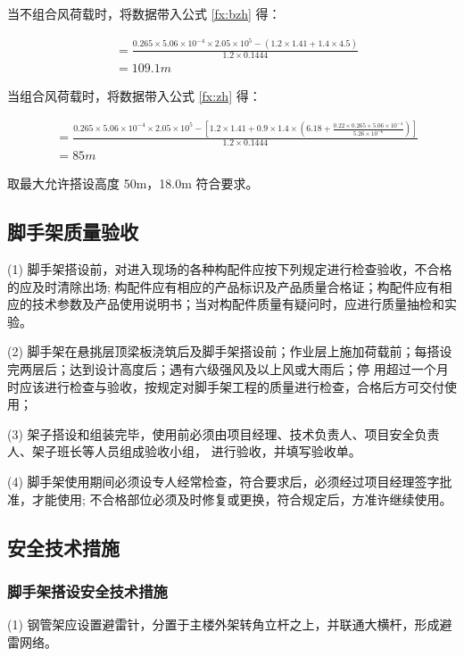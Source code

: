 当不组合风荷载时，将数据带入公式 \ref{fx:bzh} 得：

\begin{align*}
    [H] &=\frac{0.265\times 5.06\times10^{-4}\times 2.05\times 10^5-(1.2\times 1.41+1.4\times 4.5)}{1.2\times 0.1444}\\
    &=109.1m
\end{align*}

当组合风荷载时，将数据带入公式 \ref{fx:zh} 得：

\begin{align*}
[H] &=\frac{0.265\times 5.06\times10^{-4}\times 2.05\times10^5-[1.2\times 1.41+0.9\times 1.4\times(6.18+\frac{0.22\times 0.265\times 5.06\times 10^{-4}}{5.26\times 10^{-6}})]}{1.2\times 0.1444}\\
&=85m
\end{align*}

取最大允许搭设高度 50m，18.0m 符合要求。

\subsection{脚手架质量验收}

(1) 脚手架搭设前，对进入现场的各种构配件应按下列规定进行检查验收，不合格的应及时清除出场;
构配件应有相应的产品标识及产品质量合格证；构配件应有相应的技术参数及产品使用说明书；当对构配件质量有疑问时，应进行质量抽检和实
验。

(2) 脚手架在悬挑层顶梁板浇筑后及脚手架搭设前；作业层上施加荷载前；每搭设完两层后；达到设计高度后；遇有六级强风及以上风或大雨后；停
用超过一个月时应该进行检查与验收，按规定对脚手架工程的质量进行检查，合格后方可交付使用；

(3) 架子搭设和组装完毕，使用前必须由项目经理、技术负责人、项目安全负责人、架子班长等人员组成验收小组，
进行验收，并填写验收单。

(4) 脚手架使用期间必须设专人经常检查，符合要求后，必须经过项目经理签字批准，才能使用;
不合格部位必须及时修复或更换，符合规定后，方准许继续使用。 

\subsection{安全技术措施}
\subsubsection{脚手架搭设安全技术措施}

(1) 钢管架应设置避雷针，分置于主楼外架转角立杆之上，并联通大横杆，形成避雷网络。

